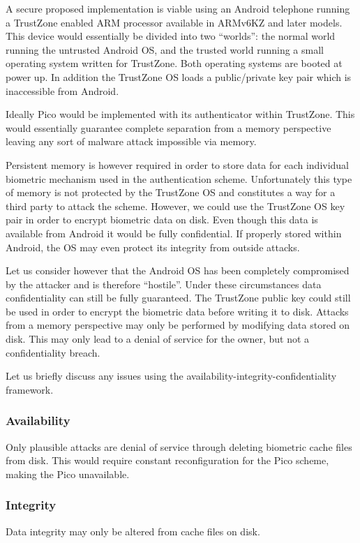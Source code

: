 A secure proposed implementation is viable using an Android telephone running a TrustZone enabled ARM processor available in ARMv6KZ \cite{} and later models. This device would essentially be divided into two ``worlds'': the normal world running the untrusted Android OS, and the trusted world running a small operating system written for TrustZone. Both operating systems are booted at power up. In addition the TrustZone OS loads a public/private key pair which is inaccessible from Android.  

Ideally Pico would be implemented with its authenticator within TrustZone. This would essentially guarantee complete separation from a memory perspective leaving any sort of malware attack impossible via memory. 

Persistent memory is however required in order to store data for each individual biometric mechanism used in the authentication scheme. Unfortunately this type of memory is not protected by the TrustZone OS and constitutes a way for a third party to attack the scheme. However, we could use the TrustZone OS key pair in order to encrypt biometric data on disk. Even though this data is available from Android it would be fully confidential. If properly stored within Android, the OS may even protect its integrity from outside attacks.

Let us consider however that the Android OS has been completely compromised by the attacker and is therefore ``hostile''. Under these circumstances data confidentiality can still be fully guaranteed. The TrustZone public key could still be used in order to encrypt the biometric data before writing it to disk. Attacks from a memory perspective may only be performed by modifying data stored on disk. This may only lead to a denial of service for the owner, but not a confidentiality breach.

Let us briefly discuss any issues using the availability-integrity-confidentiality framework.
	\subsubsection*{Availability}
	Only plausible attacks are denial of service through deleting biometric cache files from disk. This would require constant reconfiguration for the Pico scheme, making the Pico unavailable.
	
	\subsubsection*{Integrity}
	Data integrity may only be altered from cache files on disk.
	
